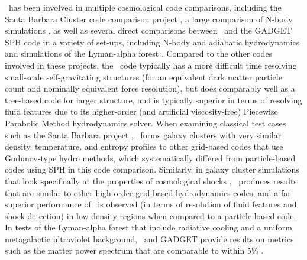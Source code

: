 \enzo\ has been involved in multiple cosmological code comparisons,
including the Santa Barbara Cluster code comparison project
\citep{SantaBarbara}, a large comparison of N-body simulations
\citep{2008CS&D....1a5003H}, as well as several direct comparisons
between \enzo\ and the GADGET SPH code in a variety of
set-ups, including N-body and adiabatic hydrodynamics
\citep{2005ApJS..160....1O,2005MNRAS.364..909V, 2011MNRAS.418..960V}
and simulations of the Lyman-alpha forest \citep{2007MNRAS.374..196R}.
Compared to the other codes involved in these projects, the \enzo\ code typically has a more difficult time resolving
small-scale self-gravitating structures (for an equivalent dark matter
particle count and nominally equivalent force resolution), but does
comparably well as a tree-based code for larger structure, and is
typically superior in terms of resolving fluid features due to its
higher-order (and artificial viscosity-free) Piecewise Parabolic
Method hydrodynamics solver.  When examining classical test cases such
as the Santa Barbara project \citep{SantaBarbara}, \enzo\ forms galaxy
clusters with very similar density, temperature, and entropy profiles
to other grid-based codes that use Godunov-type hydro methods, which
systematically differed from particle-based codes using SPH in this
code comparison.  Similarly, in galaxy cluster simulations that look
specifically at the properties of cosmological shocks
\citep[e.g.][]{2011MNRAS.418..960V}, \enzo\ produces results that are
similar to other high-order grid-based hydrodynamics codes, and a far
superior performance of \enzo\ is observed (in terms of resolution of
fluid features and shock detection) in low-density regions when
compared to a particle-based code.  In tests of the Lyman-alpha forest
that include radiative cooling and a uniform metagalactic ultraviolet
background, \enzo\ and GADGET provide results on metrics such as the
matter power spectrum that are comparable to within 5\%
\citep{2007MNRAS.374..196R}.

